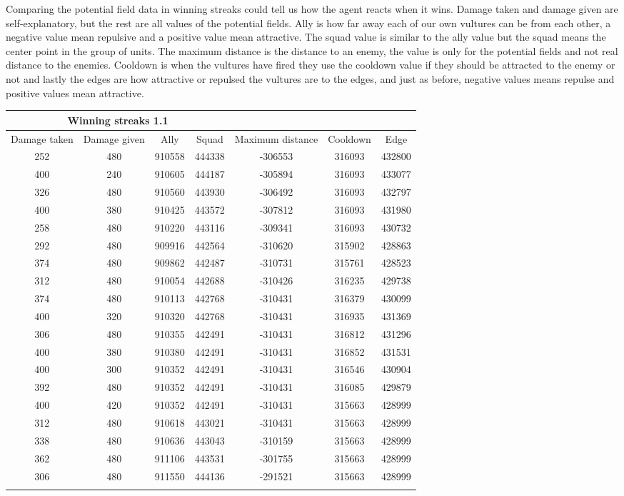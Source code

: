 Comparing the potential field data in winning streaks could tell us how the agent reacts when it wins. Damage taken and damage given are self-explanatory, but the rest are all values of the potential fields. Ally is how far away each of our own vultures can be from each other, a negative value mean repulsive and a positive value mean attractive. The squad value is similar to the ally value but the squad means the center point in the group of units. The maximum distance is the distance to an enemy, the value is only for the potential fields and not real distance to the enemies. Cooldown is when the vultures have fired they use the cooldown value if they should be attracted to the enemy or not and lastly the edges are how attractive or repulsed the vultures are to the edges, and just as before, negative values means repulse and positive values mean attractive. 
\newpage
\begin{centering}
 \begin{tabular}{|c||c|c|c|c|c|c|}
	\multicolumn{4}{c}{Winning streaks 1.1} \\
	\hline
	Damage taken & Damage given & Ally & Squad & Maximum distance & Cooldown & Edge \\
	\hline
	
	252&		480&			910558&	444338&	-306553&			316093&	432800\\
	400&		240&			910605&	444187&	-305894&			316093&	433077\\
	326&		480&			910560&	443930&	-306492&			316093&	432797\\
	400&		380&			910425&	443572&	-307812&			316093&	431980\\
	258&		480&			910220&	443116&	-309341&			316093&	430732\\
	292&		480&			909916&	442564&	-310620&			315902&	428863\\
	374&		480&			909862&	442487&	-310731&			315761&	428523\\
	312&		480&			910054&	442688&	-310426&			316235&	429738\\
	374&		480&			910113&	442768&	-310431&			316379&	430099\\
	400&		320&			910320&	442768&	-310431&			316935&	431369\\
	306&		480&			910355&	442491&	-310431&			316812&	431296\\
	400&		380&			910380&	442491&	-310431&			316852&	431531\\
	400&		300&			910352&	442491&	-310431&			316546&	430904\\
	392&		480&			910352&	442491&	-310431&			316085&	429879\\
	400&		420&			910352&	442491&	-310431&			315663&	428999\\
	312&		480&			910618&	443021&	-310431&			315663&	428999\\
	338&		480&			910636&	443043&	-310159&			315663&	428999\\
	362&		480&			911106&	443531&	-301755&			315663&	428999\\
	306&		480&			911550&	444136&	-291521&			315663&	428999\\
	\hline
	\label{winning_streak_1.1}
\end{tabular}
\end{centering}
